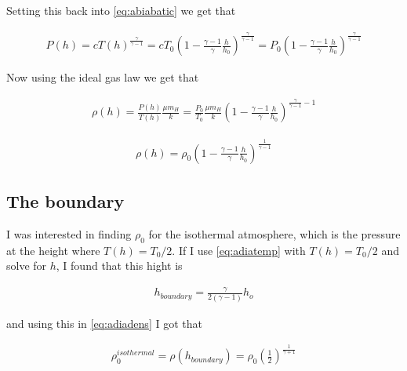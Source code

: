 \documentclass[a4paper, 10pt]{article}
\begin{document}
Setting this back into \ref{eq:abiabatic} we get that

\begin{align}
P(h) = cT(h)^{\frac{\gamma}{\gamma-1}} = cT_0 \left( 1 -\frac{\gamma - 1}{\gamma} \frac{h}{h_0} \right)^{\frac{\gamma}{\gamma-1}} = P_0\left( 1 -\frac{\gamma - 1}{\gamma} \frac{h}{h_0} \right)^{\frac{\gamma}{\gamma-1}}
\end{align}

Now using the ideal gas law we get that

\begin{align}
\rho (h) = \frac{P(h)}{T(h)}\frac{\mu m_H}{k} = \frac{P_0}{T_0}\frac{\mu m_H}{k}\left( 1 -\frac{\gamma - 1}{\gamma} \frac{h}{h_0} \right)^{\frac{\gamma}{\gamma-1} - 1}
\end{align}

\begin{align}\label{eq:adiadens}
\rho (h) = \rho_0 \left(1-\frac{\gamma - 1}{\gamma} \frac{h}{h_0}\right)^{\frac{1}{\gamma - 1}}
\end{align}

\subsection{The boundary}
I was interested in finding $\rho_0$ for the isothermal atmosphere, which is the pressure at the height where $T(h) = T_0/2$. If I use \ref{eq:adiatemp} with  $T(h) = T_0/2$ and solve for $h$, I found that this hight is

\begin{align}
h_{boundary} = \frac{\gamma}{2(\gamma -1)}h_o
\end{align}

and using this in \ref{eq:adiadens} I got that 

\begin{align}
\rho_0^{isothermal} = \rho(h_{boundary}) = \rho_0 \left(\frac{1}{2} \right) ^{\frac{1}{\gamma +1}}
\end{align}


 

\end{document}
